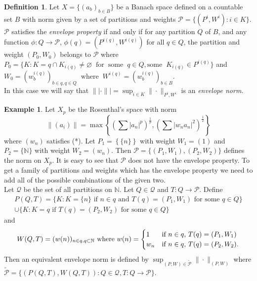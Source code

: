 \documentclass[12pt]{amsart}
\theoremstyle{definition}
\newtheorem{example}[theorem]{Example}
\newtheorem{definition}[theorem]{Definition}
\theoremstyle{remark}
\numberwithin{equation}{section}
\begin{document}
\begin{definition}\label{Def-enve-norm} Let $X= \{ (a_b)_{b\in B}\}$ 
be a Banach space defined 
on a countable set $B$ with norm given by a set of partitions and
 weights
 ${\mathcal{P}}=\{(P^i, W^i): i\in K\}$. 
$\mathcal{P}$ satisfies 
the {\it envelope property}
if and only if for any
 partition $Q$ of $B$, and any function $\phi: Q \rightarrow
 {\mathcal{P}}$, $\phi(q)= (P^{i(q)}, W^{i(q)})$ for all $q\in Q$, 
the partition and weight
 $(P_0, W_0)$ belongs to $ \mathcal{P}$ where 
$P_0=\{ K : K = q \cap K_{i(q)}\neq \varnothing \phantom{x}\text{for}
\phantom{x} \text{some}\phantom{x} q\in Q, \text{some}
\phantom{x} K_{i(q)}\in P^{i(q)}\}$ and 
$W_0= (w_{b}^{i(q)})_{b\in q, q\in Q} \phantom{x}\text{where}
\phantom{x} W^{i(q)}=(w_{b}^{i(q)})_{b\in B}$.\\
In this case we will say that
$\|| \cdot \|| = \sup_{i\in K}
 \| \cdot \|_{P^i,W^i}$ is an {\it envelope norm.}
\end{definition}
\begin{example} \label{Xp} Let $X_p$ be the Rosenthal's space with norm 
$$\| (a_i)\|=\max \left\{ \left(\sum |a_n|^p\right)^{\frac{1}{p}},
 \left(\sum |w_na_n|^2\right)^{\frac{1}{2}}\right\} $$
where $(w_n)$ satisfies (*).
Let $P_1=\left\{ \{n\} \right\}$ with weight $W_1=(1)$ and
 $P_2=\{{\mathbb{N}}\}$ with weight $W_2=(w_n)$.
 Then ${\mathcal{P}}=\{ (P_1, W_1), (P_2, W_2)\}$ defines the norm on
 $X_p$. It is easy to see that $\mathcal{P}$ does not have the
 envelope property. To get a family of partitions and weights which
 has the envelope property we need to add all of the possible
 combinations of the given two.\\
Let $\mathcal{Q}$ be the set of all partitions on $\mathbb{N}$.
 Let $Q\in \mathcal{Q}$ and $T: Q \rightarrow \mathcal{P}$. Define
\begin{multline*} P(Q, T)=\{ K: K=\{ n\} \text{ if $n\in q$ and } 
T(q)=(P_1, W_1) \text{ for some $q\in Q$}\}\\
\cup\{K: K=q \text{ if }
 T(q)=(P_2, W_2)\text{ for some $q\in Q$}\}
\end{multline*}
and
\begin{equation*}W(Q,T)= (w(n))_{n\in q, q\subset \mathbb{N}}\text{ where
}\\w(n)=\begin{cases} 
1& \text{if $n\in q$, $T(q)=(P_1, W_1)$ }\\
w_n& \text{if $n\in q$, $T(q)=(P_2, W_2)$}.
\end{cases}
\end{equation*}
Then an equivalent envelope norm is defined by 
$\sup_{(P,W)\in \tilde{\mathcal{P}}}\|\cdot\|_{(P,W)}$ where\\
$\tilde{\mathcal{P}}=\{(P(Q,T),W(Q,T)): Q \in{\mathcal{Q}},
 T: Q\rightarrow \mathcal{P}\}$.
\end{example}
\end{document}
